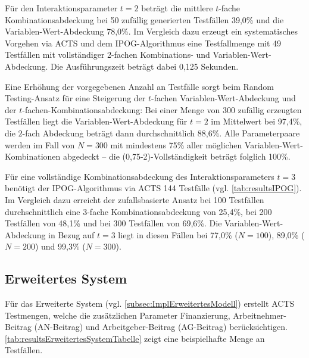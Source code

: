 Für den Interaktionsparameter $t=2$ beträgt die mittlere $t$-fache Kombinationsabdeckung bei 50 zufällig generierten Testfällen 39,0\% und die Variablen-Wert-Abdeckung 78,0\%. Im Vergleich dazu erzeugt ein systematisches Vorgehen via ACTS und dem IPOG-Algorithmus eine Testfallmenge mit 49 Testfällen mit vollständiger 2-fachen Kombinations- und Variablen-Wert-Abdeckung. Die Ausführungszeit beträgt dabei 0,125 Sekunden.

Eine Erhöhung der vorgegebenen Anzahl an Testfälle sorgt beim Random Testing-Ansatz für eine Steigerung der $t$-fachen Variablen-Wert-Abdeckung und der $t$-fachen-Kombinationsabdeckung: Bei einer Menge von 300 zufällig erzeugten Testfällen liegt die Variablen-Wert-Abdeckung für $t=2$ im Mittelwert bei 97,4\%, die $2$-fach Abdeckung beträgt dann durchschnittlich 88,6\%. Alle Parameterpaare werden im Fall von $N=300$ mit mindestens 75\% aller möglichen Variablen-Wert-Kombinationen abgedeckt -- die (0,75-2)-Vollständigkeit beträgt folglich 100\%.

Für eine vollständige Kombinationsabdeckung des Interaktionsparameters $t=3$ benötigt der IPOG-Algorithmus via ACTS 144 Testfälle (vgl. \autoref{tab:resultsIPOG}). Im Vergleich dazu erreicht der zufallsbasierte Ansatz bei 100 Testfällen durchschnittlich eine 3-fache Kombinationsabdeckung von 25,4\%, bei 200 Testfällen von 48,1\% und bei 300 Testfällen von 69,6\%. Die Variablen-Wert-Abdeckung in Bezug auf $t=3$ liegt in diesen Fällen bei 77,0\% ($N=100$), 89,0\% ($N=200$) und 99,3\% ($N=300$).

\subsection{Erweitertes System}\label{subsec:resultsComplexSystem}

Für das Erweiterte System (vgl. \autoref{subsec:ImplErweitertesModell}) erstellt ACTS Testmengen, welche die zusätzlichen Parameter Finanzierung, Arbeitnehmer-Beitrag (AN-Beitrag) und Arbeitgeber-Beitrag (AG-Beitrag) berücksichtigen. \autoref{tab:resultsErweitertesSystemTabelle} zeigt eine beispielhafte Menge an Testfällen.

